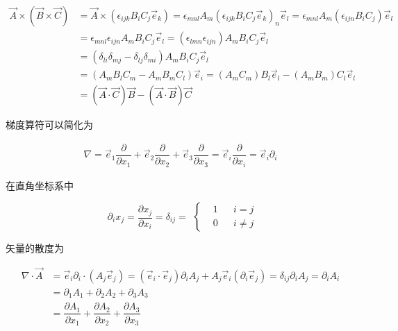 \begin{equation*}
  \begin{aligned}
    \vec{A} \times \left( \vec{B} \times \vec{C} \right) &= \vec{A} \times \left( \epsilon_{ijk} B_i C_j \vec{e}_k \right) = \epsilon_{mnl} A_m \left( \epsilon_{ijk} B_i C_j \vec{e}_k  \right)_n \vec{e}_l = \epsilon_{mnl} A_m \left( \epsilon_{ijn} B_i C_j \right) \vec{e}_l \\
    &= \epsilon_{mnl} \epsilon_{ijn} A_m B_i C_j \vec{e}_l = \left( \epsilon_{lmn} \epsilon_{ijn} \right) A_m B_i C_j \vec{e}_l \\
    &= \left( \delta_{li} \delta_{mj} - \delta_{lj} \delta_{mi} \right) A_m B_i C_j \vec{e}_l \\
    &= \left( A_m B_l C_m - A_m B_m C_l \right) \vec{e}_i = \left( A_m C_m \right) B_l \vec{e}_l - \left( A_m B_m \right) C_l \vec{e}_l \\
    &= \left( \vec{A} \cdot \vec{C} \right) \vec{B} - \left( \vec{A} \cdot \vec{B} \right) \vec{C}
  \end{aligned}
\end{equation*}

梯度算符可以简化为

\begin{equation*}
  \begin{aligned}
    \nabla = \vec{e}_1 \dfrac{\partial}{\partial x_1} +  \vec{e}_2 \dfrac{\partial}{\partial x_2} + \vec{e}_3 \dfrac{\partial}{\partial x_3} = \vec{e}_i \dfrac{\partial}{\partial x_i} = \vec{e}_i \partial_i 
  \end{aligned}
\end{equation*}

在直角坐标系中

\begin{equation*}
  \begin{aligned}
    \partial_i x_j = \dfrac{\partial x_j}{\partial x_i} = \delta_{ij} =  
  \end{aligned}
  \left\{
  \begin{aligned}
    & 1 && i=j \\
    & 0 && i \neq j
  \end{aligned}
  \right.
\end{equation*}

矢量的散度为

\begin{equation*}
  \begin{aligned}
    \nabla \cdot \vec{A} &= \vec{e}_i \partial_i \cdot \left( A_j \vec{e}_j \right) = \left( \vec{e}_i \cdot \vec{e}_j \right) \partial_i A_j + A_j \vec{e}_i \left( \partial_i \vec{e}_j \right) = \delta_{ij} \partial_i A_j = \partial_i A_i \\
    &= \partial_1 A_1 + \partial_2 A_2 + \partial_3 A_3 \\
    &= \dfrac{\partial A_1}{\partial x_1} + \dfrac{\partial A_2}{\partial x_2} + \dfrac{\partial A_3}{\partial x_3}   
  \end{aligned}
\end{equation*}

